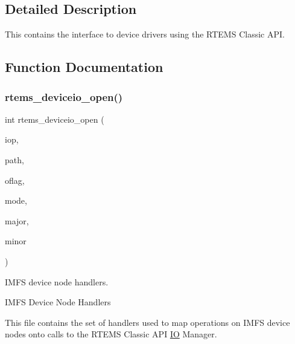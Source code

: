 \subsection{Detailed Description}
This contains the interface to device drivers using the R\+T\+E\+MS Classic A\+PI. 

\subsection{Function Documentation}
\mbox{\label{group__IMFSDevices_gac8fab61009ee48675f95f5b41accba67}} 
\subsubsection{\texorpdfstring{rtems\_deviceio\_open()}{rtems\_deviceio\_open()}}
{\footnotesize\ttfamily int rtems\+\_\+deviceio\+\_\+open (\begin{DoxyParamCaption}\item[{\mbox{\hyperlink{structrtems__libio__tt}{rtems\+\_\+libio\+\_\+t}} $\ast$}]{iop,  }\item[{const char $\ast$}]{path,  }\item[{int}]{oflag,  }\item[{mode\+\_\+t}]{mode,  }\item[{rtems\+\_\+device\+\_\+major\+\_\+number}]{major,  }\item[{rtems\+\_\+device\+\_\+minor\+\_\+number}]{minor }\end{DoxyParamCaption})}



I\+M\+FS device node handlers. 

I\+M\+FS Device Node Handlers

This file contains the set of handlers used to map operations on I\+M\+FS device nodes onto calls to the R\+T\+E\+MS Classic A\+PI \mbox{\hyperlink{structIO}{IO}} Manager. 